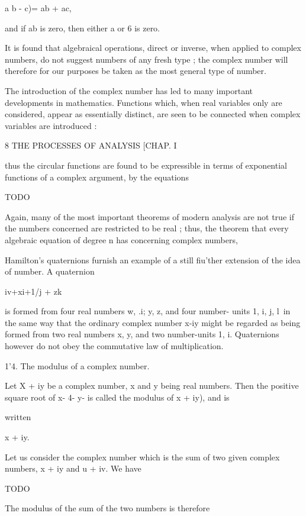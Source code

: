 a  b -\- c)= ab + ac, 

and if ab is zero, then either a or 6 is zero. 

It is found that algebraical operations, direct or inverse, when applied to 
complex numbers, do not suggest numbers of any fresh type ; the complex 
number will therefore for our purposes be taken as the most general type 
of number. 

The introduction of the complex number has led to many important developments in 
mathematics. Functions which, when real variables only are considered, appear as 
essentially distinct, are seen to be connected when complex variables are introduced : 



8 THE PROCESSES OF ANALYSIS [CHAP. I 

thus the circular functions are found to be expressible in terms of exponential functions 
of a complex argument, by the equations 

TODO

Again, many of the most important theorems of modern analysis are not true if the 
numbers concerned are restricted to be real ; thus, the theorem that every algebraic 
equation of degree n has %
concerning complex numbers, 

Hamilton's quaternions furnish an example of a still fiu'ther extension of the idea 
of number. A quaternion 

iv+xi+1/j + zk 

is formed from four real numbers w, .i; y, z, and four number- units 1, i, j, l\ in the same 
way that the ordinary complex number x-\-iy might be regarded as being formed from 
two real numbers x, y, and two number-units 1, i. Quaternions however do not obey 
the commutative law of multiplication. 

1'4. The modulus of a complex number. 

Let X + iy be a complex number, x and y being real numbers. Then 
the positive square root of x- 4- y- is called the modulus of  x + iy), and is 

written 

x + iy. 

Let us consider the complex number which is the sum of two given 
complex numbers, x + iy and u + iv. We have 

TODO

The modulus of the sum of the two numbers is therefore 

